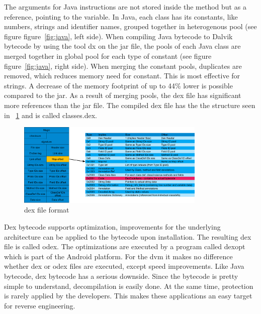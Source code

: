 The arguments for Java instructions are not stored inside the method but as a reference, pointing to the variable.
In Java, each class has its constants, like numbers, strings and identifier names, grouped together in heterogenous pool (see figure figure~\ref{fig:java}, left side).
When compiling Java bytecode to Dalvik bytecode by using the tool dx on the \gls{jar} file,
the pools of each Java class are merged together in global pool for each type of constant (see figure figure~\ref{fig:java}, right side).
When merging the constant pools, duplicates are removed, which reduces memory need for constant.
This is most effective for strings.
A decrease of the memory footprint of up to 44\% lower is possible compared to the \gls{jar}.
As a result of merging pools, the \gls{dex} file has significant more references than the \gls{jar} file.
The compiled \gls{dex} file has the the structure seen in \figure~\ref{fig:dex} and is called classes.dex. \cite{ehringerDalvik}
\begin{figure}[h]
    \centering
    \includegraphics[width=0.8\textwidth]{data/dex.png}
    \caption{\gls{dex} file format \cite{andevconDalvikART}}
    \label{fig:dex}
\end{figure}
\newline
\newline
Dex bytecode supports optimization, improvements for the underlying architecture can be applied to the bytecode upon installation.
The resulting \gls{dex} file is called \gls{odex}.
The optimizations are executed by a program called dexopt which is part of the Android platform.
For the \gls{dvm} it makes no difference whether \gls{dex} or \gls{odex} files are executed, except speed improvements.
\newline
Like Java bytecode, \gls{dex} bytecode has a serious downside.
Since the bytecode is pretty simple to understand, decompilation is easily done.
At the same time, protection is rarely applied by the developers.
This makes these applications an easy target for reverse engineering.
